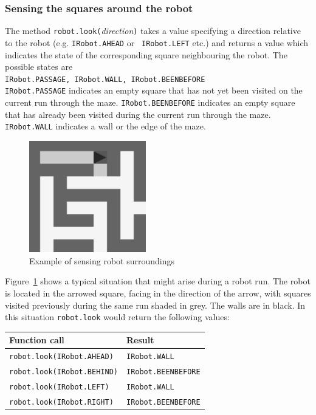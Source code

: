 \subsubsection{Sensing the squares around the robot}
\label{lookmethod}

The method {\tt robot.look(}{\em direction}{\tt )} takes a value
specifying a direction relative to the robot (e.g. {\tt IRobot.AHEAD} or {\tt
IRobot.LEFT} etc.) and returns a value which indicates the state of the
corresponding square neighbouring the robot. The possible states are\\

{\tt IRobot.PASSAGE, IRobot.WALL, IRobot.BEENBEFORE}\\

\noindent
{\tt IRobot.PASSAGE} indicates an empty square that has not yet been 
visited on the
current run through the maze. {\tt IRobot.BEENBEFORE} indicates an empty 
square that
has already been visited during the current run through the maze. {\tt
IRobot.WALL} indicates a wall or the edge of the maze.\\

\begin{figure}
\centering
\includegraphics[width=2in]{mousemove}
\caption{Example of sensing robot surroundings\label{sensing}}
\end{figure}

\noindent
Figure~\ref{sensing} shows a typical situation that might arise during a
robot run. 
The robot is located in the arrowed square, facing in the direction of
the arrow, with squares visited previously during the same run shaded
in grey. The walls are in black. In this situation
{\tt robot.look} would return the following values:

\begin{center}
\begin{tabular}{l l} \hline
Function call & Result \\ \hline
{\tt robot.look(IRobot.AHEAD)}  & {\tt IRobot.WALL} \\
{\tt robot.look(IRobot.BEHIND)} & {\tt IRobot.BEENBEFORE} \\
{\tt robot.look(IRobot.LEFT)}   & {\tt IRobot.WALL} \\
{\tt robot.look(IRobot.RIGHT)}  & {\tt IRobot.BEENBEFORE} \\ \hline
\end{tabular}
\end{center}

